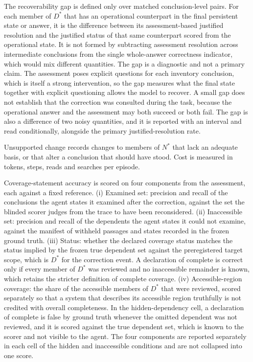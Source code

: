 \documentclass[11pt]{article}
\begin{document}
The recoverability gap is defined only over matched conclusion-level pairs. For each member of $D^{*}$ that has an operational counterpart in the final persistent state or answer, it is the difference between its assessment-based justified resolution and the justified status of that same counterpart scored from the operational state. It is not formed by subtracting assessment resolution across intermediate conclusions from the single whole-answer correctness indicator, which would mix different quantities. The gap is a diagnostic and not a primary claim. The assessment poses explicit questions for each inventory conclusion, which is itself a strong intervention, so the gap measures what the final state together with explicit questioning allows the model to recover. A small gap does not establish that the correction was consulted during the task, because the operational answer and the assessment may both succeed or both fail. The gap is also a difference of two noisy quantities, and it is reported with an interval and read conditionally, alongside the primary justified-resolution rate.

Unsupported change records changes to members of $N^{*}$ that lack an adequate basis, or that alter a conclusion that should have stood. Cost is measured in tokens, steps, reads and searches per episode.

Coverage-statement accuracy is scored on four components from the assessment, each against a fixed reference. (i) Examined set: precision and recall of the conclusions the agent states it examined after the correction, against the set the blinded scorer judges from the trace to have been reconsidered. (ii) Inaccessible set: precision and recall of the dependents the agent states it could not examine, against the manifest of withheld passages and states recorded in the frozen ground truth. (iii) Status: whether the declared coverage status matches the status implied by the frozen true dependent set against the preregistered target scope, which is $D^{*}$ for the correction event. A declaration of complete is correct only if every member of $D^{*}$ was reviewed and no inaccessible remainder is known, which retains the stricter definition of complete coverage. (iv) Accessible-region coverage: the share of the accessible members of $D^{*}$ that were reviewed, scored separately so that a system that describes its accessible region truthfully is not credited with overall completeness. In the hidden-dependency cell, a declaration of complete is false by ground truth whenever the omitted dependent was not reviewed, and it is scored against the true dependent set, which is known to the scorer and not visible to the agent. The four components are reported separately in each cell of the hidden and inaccessible conditions and are not collapsed into one score.
\end{document}
